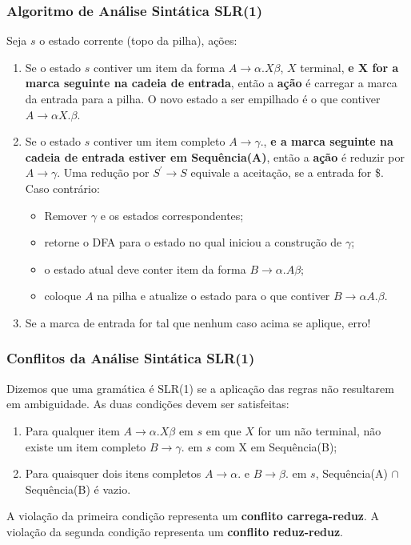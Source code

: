\documentclass[table]{beamer}
\begin{document}
\begin{frame}
   \frametitle{Algoritmo de Análise Sintática SLR(1)}
   Seja $s$ o estado corrente (topo da pilha), ações:
   \begin{enumerate}
      \item Se o estado $s$ contiver um item da forma $A\to\alpha.X\beta$, $X$ terminal, \textbf{e X for a marca seguinte na cadeia de entrada}, então a \textbf{ação} é carregar a marca da entrada para a pilha. O novo estado a ser empilhado é o que contiver $A\to\alpha X.\beta$.
      \item Se o estado $s$ contiver um item completo $A\to\gamma.$, \textbf{e a marca seguinte na cadeia de entrada estiver em Sequência(A)}, então a \textbf{ação} é reduzir por $A\to\gamma$. Uma redução por $S^{'}\to S$ equivale a aceitação, se a entrada for \$. Caso contrário:
      \begin{itemize}
         \item Remover $\gamma$ e os estados correspondentes;
	 \item retorne o DFA para o estado no qual iniciou a construção de $\gamma$;
	 \item o estado atual deve conter item da forma $B\to\alpha.A\beta$;
	 \item coloque $A$ na pilha e atualize o estado para o que contiver $B\to\alpha A.\beta$.
      \end{itemize}
      \item Se a marca de entrada for tal que nenhum caso acima se aplique, erro!
   \end{enumerate}
\end{frame}

\begin{frame}
   \frametitle{Conflitos da Análise Sintática SLR(1)}
   Dizemos que uma gramática é SLR(1) se a aplicação das regras não resultarem em ambiguidade. As duas condições devem ser satisfeitas:
   \begin{enumerate}
      \item Para qualquer item $A\to\alpha.X\beta$ em $s$ em que $X$ for um não terminal, não existe um item completo $B\to\gamma.$ em $s$ com X em Sequência(B);
      \item Para quaisquer dois itens completos $A\to\alpha.$ e $B\to\beta.$ em $s$, Sequência(A) $\cap$ Sequência(B) é vazio.
   \end{enumerate}
   A violação da primeira condição representa um \textbf{conflito carrega-reduz}. A violação da segunda condição representa um \textbf{conflito reduz-reduz}.
\end{frame}
\end{document}
